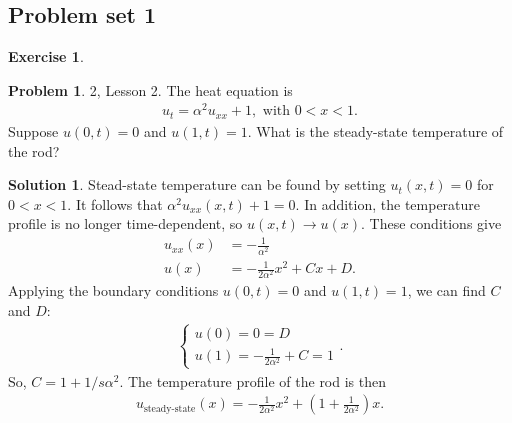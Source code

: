 \documentclass{article}
\theoremstyle{definition}
\newtheorem*{prob*}{Problem}
\newtheorem{exer}{Exercise}[section]
\newtheorem*{sln*}{Solution}
\begin{document}
\subsection{Problem set 1}
\begin{exer}
	\begin{prob*}2, Lesson 2.
		The heat equation is
		\begin{align*}
		u_t = \alpha^2 u_{xx} + 1, \text{ with }0 < x < 1.
		\end{align*}
		Suppose $u(0,t) = 0$ and $u(1,t) = 1$. What is the steady-state temperature of the rod?\\
		\begin{sln*}
			Stead-state temperature can be found by setting $u_t(x,t) = 0$ for $0 < x < 1$. It follows that $\alpha^2 u_{xx}(x,t) + 1 = 0$. In addition, the temperature profile is no longer time-dependent, so $u(x,t)\to u(x)$. These conditions give
			\begin{align*}
			u_{xx}(x) &= -\frac{1}{\alpha^2}\\
			u(x) &= -\frac{1}{2\alpha^2}x^2 + Cx + D.
			\end{align*} 
			Applying the boundary conditions $u(0,t)=0$ and $u(1,t)=1$, we can find $C$ and $D$:
			\begin{align*}
			\begin{cases}
			u(0) = 0 = D\\
			u(1) = -\frac{1}{2\alpha^2} + C = 1
			\end{cases}.
			\end{align*}
			So, $C = 1 + 1/s\alpha^2$. The temperature profile of the rod is then
			\begin{align*}
			u_{\text{steady-state}}(x) = -\frac{1}{2\alpha^2}x^2 + \left(1 + \frac{1}{2\alpha^2} \right)x .
			\end{align*}
		\end{sln*}
	\end{prob*}
	
	\newpage
	

\end{exer}
\end{document}
